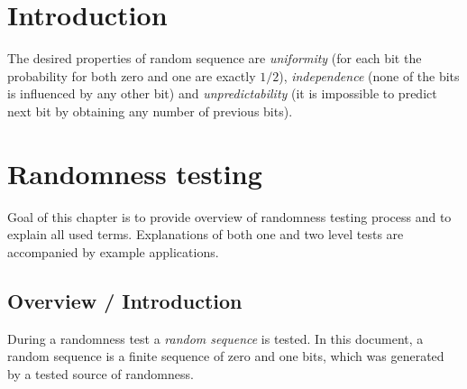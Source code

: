 \documentclass[
  digital,     %
  oneside,     %
  nosansbold,  %
  nocolorbold, %
  nolof,         %
  nolot,         %
]{fithesis4}
\begin{document}
\chapter*{Introduction}


The desired properties of random sequence are \emph{uniformity} (for each bit the probability for both zero and one are exactly $1/2$), \emph{independence} (none of the bits is influenced by any other bit) and \emph{unpredictability} (it is impossible to predict next bit by obtaining any number of previous bits). \cite[p. 1-1]{nist_special}


\chapter{Randomness testing}

Goal of this chapter is to provide overview of randomness testing process and to explain all used terms. Explanations of both one and two level tests are accompanied by example applications.

\section{Overview / Introduction} \label{chap:rand-intro}


During a randomness test a \emph{random sequence} is tested. In this document, a random sequence is a finite sequence of zero and one bits, which was generated by a tested source of randomness.  \cite[p. 1-1]{nist_special}
\end{document}
